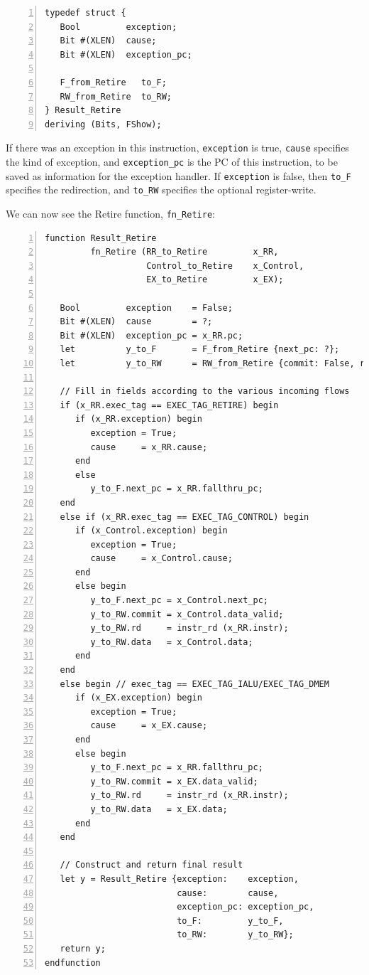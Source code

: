 {\small
\begin{Verbatim}[frame=single, numbers=left]
typedef struct {
   Bool         exception;
   Bit #(XLEN)  cause;
   Bit #(XLEN)  exception_pc;

   F_from_Retire   to_F;
   RW_from_Retire  to_RW;
} Result_Retire
deriving (Bits, FShow);
\end{Verbatim}
}

If there was an exception in this instruction, \verb|exception| is
true, \verb|cause| specifies the kind of exception, and
\verb|exception_pc| is the PC of this instruction, to be saved as
information for the exception handler.  If \verb|exception| is false,
then \verb|to_F| specifies the redirection, and \verb|to_RW| specifies
the optional register-write.

We can now see the Retire function, \verb|fn_Retire|:

{\small
\begin{Verbatim}[frame=single, numbers=left]
function Result_Retire
         fn_Retire (RR_to_Retire         x_RR,
                    Control_to_Retire    x_Control,
                    EX_to_Retire         x_EX);

   Bool         exception    = False;
   Bit #(XLEN)  cause        = ?;
   Bit #(XLEN)  exception_pc = x_RR.pc;
   let          y_to_F       = F_from_Retire {next_pc: ?};
   let          y_to_RW      = RW_from_Retire {commit: False, rd: ?, data: ?};

   // Fill in fields according to the various incoming flows
   if (x_RR.exec_tag == EXEC_TAG_RETIRE) begin
      if (x_RR.exception) begin
         exception = True;
         cause     = x_RR.cause;
      end
      else
         y_to_F.next_pc = x_RR.fallthru_pc;
   end
   else if (x_RR.exec_tag == EXEC_TAG_CONTROL) begin
      if (x_Control.exception) begin
         exception = True;
         cause     = x_Control.cause;
      end
      else begin
         y_to_F.next_pc = x_Control.next_pc;
         y_to_RW.commit = x_Control.data_valid;
         y_to_RW.rd     = instr_rd (x_RR.instr);
         y_to_RW.data   = x_Control.data;
      end
   end
   else begin // exec_tag == EXEC_TAG_IALU/EXEC_TAG_DMEM
      if (x_EX.exception) begin
         exception = True;
         cause     = x_EX.cause;
      end
      else begin
         y_to_F.next_pc = x_RR.fallthru_pc;
         y_to_RW.commit = x_EX.data_valid;
         y_to_RW.rd     = instr_rd (x_RR.instr);
         y_to_RW.data   = x_EX.data;
      end
   end

   // Construct and return final result
   let y = Result_Retire {exception:    exception,
                          cause:        cause,
                          exception_pc: exception_pc,
                          to_F:         y_to_F,
                          to_RW:        y_to_RW};
   return y;
endfunction
\end{Verbatim}
}

